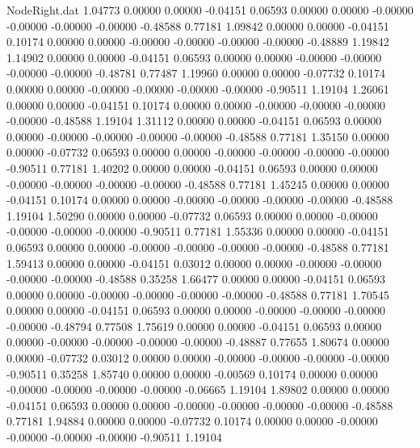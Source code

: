 \begin{filecontents}{NodeRight.dat}
   1.04773    0.00000    0.00000    -0.04151    0.06593    0.00000    0.00000   -0.00000   -0.00000   -0.00000   -0.00000   -0.48588    0.77181
   1.09842    0.00000    0.00000    -0.04151    0.10174    0.00000    0.00000   -0.00000   -0.00000   -0.00000   -0.00000   -0.48889    1.19842
   1.14902    0.00000    0.00000    -0.04151    0.06593    0.00000    0.00000   -0.00000   -0.00000   -0.00000   -0.00000   -0.48781    0.77487
   1.19960    0.00000    0.00000    -0.07732    0.10174    0.00000    0.00000   -0.00000   -0.00000   -0.00000   -0.00000   -0.90511    1.19104
   1.26061    0.00000    0.00000    -0.04151    0.10174    0.00000    0.00000   -0.00000   -0.00000   -0.00000   -0.00000   -0.48588    1.19104
   1.31112    0.00000    0.00000    -0.04151    0.06593    0.00000    0.00000   -0.00000   -0.00000   -0.00000   -0.00000   -0.48588    0.77181
   1.35150    0.00000    0.00000    -0.07732    0.06593    0.00000    0.00000   -0.00000   -0.00000   -0.00000   -0.00000   -0.90511    0.77181
   1.40202    0.00000    0.00000    -0.04151    0.06593    0.00000    0.00000   -0.00000   -0.00000   -0.00000   -0.00000   -0.48588    0.77181
   1.45245    0.00000    0.00000    -0.04151    0.10174    0.00000    0.00000   -0.00000   -0.00000   -0.00000   -0.00000   -0.48588    1.19104
   1.50290    0.00000    0.00000    -0.07732    0.06593    0.00000    0.00000   -0.00000   -0.00000   -0.00000   -0.00000   -0.90511    0.77181
   1.55336    0.00000    0.00000    -0.04151    0.06593    0.00000    0.00000   -0.00000   -0.00000   -0.00000   -0.00000   -0.48588    0.77181
   1.59413    0.00000    0.00000    -0.04151    0.03012    0.00000    0.00000   -0.00000   -0.00000   -0.00000   -0.00000   -0.48588    0.35258
   1.66477    0.00000    0.00000    -0.04151    0.06593    0.00000    0.00000   -0.00000   -0.00000   -0.00000   -0.00000   -0.48588    0.77181
   1.70545    0.00000    0.00000    -0.04151    0.06593    0.00000    0.00000   -0.00000   -0.00000   -0.00000   -0.00000   -0.48794    0.77508
   1.75619    0.00000    0.00000    -0.04151    0.06593    0.00000    0.00000   -0.00000   -0.00000   -0.00000   -0.00000   -0.48887    0.77655
   1.80674    0.00000    0.00000    -0.07732    0.03012    0.00000    0.00000   -0.00000   -0.00000   -0.00000   -0.00000   -0.90511    0.35258
   1.85740    0.00000    0.00000    -0.00569    0.10174    0.00000    0.00000   -0.00000   -0.00000   -0.00000   -0.00000   -0.06665    1.19104
   1.89802    0.00000    0.00000    -0.04151    0.06593    0.00000    0.00000   -0.00000   -0.00000   -0.00000   -0.00000   -0.48588    0.77181
   1.94884    0.00000    0.00000    -0.07732    0.10174    0.00000    0.00000   -0.00000   -0.00000   -0.00000   -0.00000   -0.90511    1.19104

\end{filecontents}
